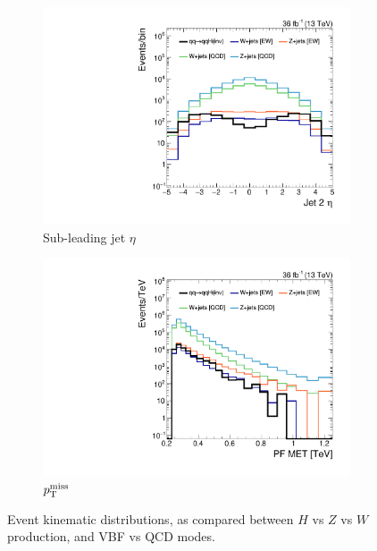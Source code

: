 \begin{figure}[]
\begin{center}
\begin{subfigure}[t]{0.32\textwidth}
            \includegraphics[width=\textwidth]{figures/vbf/shapes/loosesignal_jotEta_1__logy.pdf}
            \caption{Sub-leading jet $\eta$}
        \end{subfigure}
        \begin{subfigure}[t]{0.32\textwidth}
            \includegraphics[width=\textwidth]{figures/vbf/shapes/loosesignal_pfmet_logy.pdf}
            \caption{$p_\mathrm{T}^\mathrm{miss}$}
        \end{subfigure}
        \caption{Event kinematic distributions, as compared between $H$ vs $Z$ vs $W$ production, and VBF vs QCD modes.}
        \label{fig:vbf:jetkins}
    \end{center}
\end{figure}

